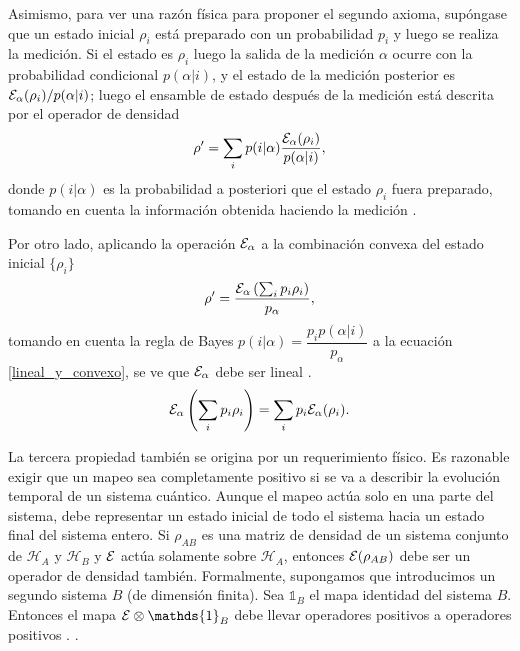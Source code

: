 Asimismo, para ver una razón física para proponer el segundo axioma, supóngase que un estado inicial $\rho_i$ está preparado con un probabilidad $p_i$ y luego se realiza la medición. Si el estado es $\rho_i $ luego la salida de la medición  $\alpha$ ocurre con la probabilidad condicional $p(\alpha|i)$, y el estado de la medición  posterior es $\mathcal{E}_\alpha(\rho_i)/p(\alpha|i)$; luego el ensamble de estado después de la medición está descrita por el operador de densidad 
\begin{equation}\label{lineal_y_convexo}
    \rho'=\sum_i p(i|\alpha)\dfrac{\mathcal{E}_\alpha(\rho_i)}{p(\alpha|i)},
\end{equation}
donde $p(i|\alpha)$ es la probabilidad a posteriori que el estado $\rho_i$
fuera preparado, tomando en cuenta la información obtenida haciendo la medición
{\cite{preskill2020quantum}}. 

Por otro lado, aplicando la operación $\mathcal{E}_\alpha$  a la combinación convexa del
estado inicial $\{\rho_i\}$ \begin{equation}
    \rho'=\dfrac{\mathcal{E}_\alpha\left(\sum_i p_i \rho_i\right)}{p_\alpha},
\end{equation} tomando en cuenta la regla de Bayes  $p(i|\alpha)=\dfrac{p_i
p(\alpha|i)}{ p_\alpha} $ a la ecuación {\ref{lineal_y_convexo}},  se ve que
$\mathcal{E}_\alpha$ debe ser lineal {\cite{preskill2020quantum}}. 
\begin{equation}
    \mathcal{E}_\alpha\left(\sum_i p_i \rho_i\right)=\sum_i p_i\mathcal{E}_\alpha(\rho_i). 
\end{equation}

La tercera propiedad también se origina por un requerimiento físico. Es
razonable exigir que un mapeo sea completamente positivo si se va a describir
la evolución temporal de un sistema cuántico. Aunque el mapeo actúa solo en una
parte del sistema, debe representar un estado inicial de todo el sistema hacia
un estado final del sistema entero. Si $\rho_{AB}$ es una matriz de densidad de
un sistema conjunto de $\mathcal{H}_A$ y $\mathcal{H}_{B}$  y $\mathcal{E}$ actúa
solamente sobre $\mathcal{H}_A$, entonces $\mathcal{E}(\rho_{AB})$  debe ser un operador
de densidad también. Formalmente, supongamos que introducimos un segundo
sistema $B$ (de dimensión finita). Sea $\mathds{1}_{B}$ el mapa identidad del
sistema $B$. Entonces el mapa $\E\otimes \mathds{1}_{B}$ debe llevar operadores
positivos a operadores positivos {\cite{nielsen_chuang_2010, preskill2020quantum}}. 
. 

